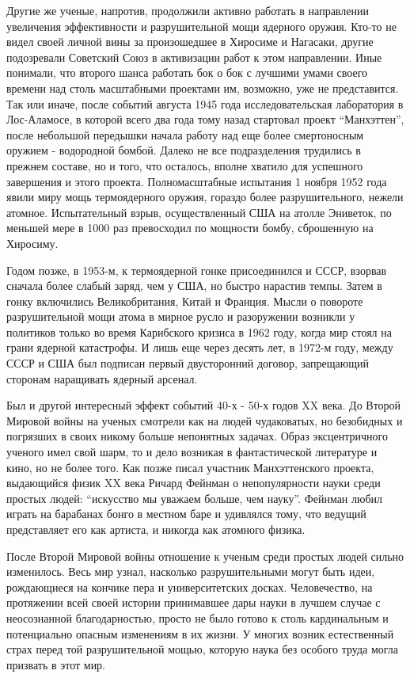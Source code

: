 Другие же ученые, напротив, продолжили активно работать в направлении увеличения эффективности и разрушительной мощи ядерного оружия.
Кто-то не видел своей личной вины за произошедшее в Хиросиме и Нагасаки, другие подозревали Советский Союз в активизации работ к этом направлении.
Иные понимали, что второго шанса работать бок о бок с лучшими умами своего времени над столь масштабными проектами им, возможно, уже не представится. 
Так или иначе, после событий августа 1945 года исследовательская лаборатория в Лос-Аламосе, в которой всего два года тому назад стартовал проект ``Манхэттен'', после небольшой передышки начала работу над еще более смертоносным оружием - водородной бомбой.
Далеко не все подразделения трудились в прежнем составе, но и того, что осталось, вполне хватило для успешного завершения и этого проекта. 
Полномасштабные испытания 1 ноября 1952 года явили миру мощь термоядерного оружия, гораздо более разрушительного, нежели атомное.
Испытательный взрыв, осуществленный США на атолле Эниветок, по меньшей мере в 1000 раз превосходил по мощности бомбу, сброшенную на Хиросиму.

Годом позже, в 1953-м, к термоядерной гонке присоединился и СССР, взорвав сначала более слабый заряд, чем у США, но быстро нарастив темпы. 
Затем в гонку включились Великобритания, Китай и Франция.
Мысли о повороте разрушительной мощи атома в мирное русло и разоружении возникли у политиков только во время Карибского кризиса в 1962 году, когда мир стоял на грани ядерной катастрофы. 
И лишь еще через десять лет, в 1972-м году, между СССР и США был подписан первый двусторонний договор, запрещающий сторонам наращивать ядерный арсенал.

Был и другой интересный эффект событий 40-х - 50-х годов XX века.
До Второй Мировой войны на ученых смотрели как на людей чудаковатых, но безобидных и погрязших в своих никому больше непонятных задачах. 
Образ эксцентричного ученого имел свой шарм, то и дело возникая в фантастической литературе и кино, но не более того.
Как позже писал участник Манхэттенского проекта, выдающийся физик XX века Ричард Фейнман о непопулярности науки среди простых людей: ``искусство мы уважаем больше, чем науку''.
Фейнман любил играть на барабанах бонго в местном баре и удивлялся тому, что ведущий представляет его как артиста, и никогда как атомного физика. 

После Второй Мировой войны отношение к ученым среди простых людей сильно изменилось.
Весь мир узнал, насколько разрушительными могут быть идеи, рождающиеся на кончике пера и университетских досках.
Человечество, на протяжении всей своей истории принимавшее дары науки в лучшем случае с неосознанной благодарностью, просто не было готово к столь кардинальным и потенциально опасным изменениям в их жизни.
У многих возник естественный страх перед той разрушительной мощью, которую наука без особого труда могла призвать в этот мир. 

